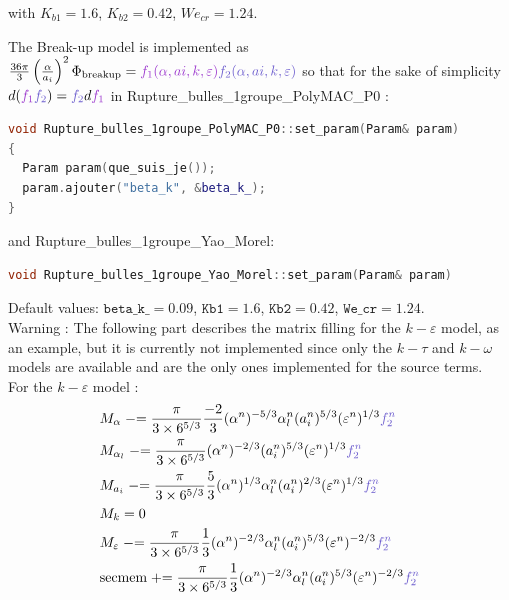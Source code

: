 with $K_{b1} = 1.6$, $K_{b2} = 0.42$, $We_{cr} = 1.24$.

The {\colorbox{codebackground}{\color{codekeyword3}  Break-up}} model is implemented as $\frac{36\pi}{3}\parent{\frac{\alpha}{a_i}}^2\Phi_{\text{breakup}}={\color{mydarkorchid}f_1(\alpha,ai,k,\varepsilon)}{\color{myslateblue} f_2(\alpha,ai,k,\varepsilon)}$ so that for the sake of simplicity $d({\color{mydarkorchid}f_1}{\color{myslateblue} f_2})={\color{myslateblue} f_2}d{\color{mydarkorchid} f_1}$  in {\color{mydarkorchid} Rupture_bulles_1groupe_PolyMAC_P0} : 
\begin{lstlisting}[language=c++]
void Rupture_bulles_1groupe_PolyMAC_P0::set_param(Param& param)
{
  Param param(que_suis_je());
  param.ajouter("beta_k", &beta_k_);
}
\end{lstlisting}
and {\color{myslateblue} Rupture_bulles_1groupe_Yao_Morel}:
\begin{lstlisting}[language=c++]
void Rupture_bulles_1groupe_Yao_Morel::set_param(Param& param)
\end{lstlisting}
Default values: $\texttt{beta\_k\_} = 0.09$, $\texttt{Kb1} = 1.6$, $\texttt{Kb2} = 0.42$, $\texttt{We\_cr} = 1.24$.\\
{\color{red} Warning} : The following part describes the matrix filling for the $k-\varepsilon$ model, as an example, but it is currently not implemented since only the $k-\tau$ and $k-\omega$ models are available and are the only ones implemented for the source terms.\\
For the $k-\varepsilon$ model : 
\begin{align}
    &M_{\alpha} \minuseq \frac{\pi}{3\times 6^{5/3}}\frac{-2}{3}(\alpha^n)^{-5/3}\alpha_l^n(a_i^n)^{5/3}(\varepsilon^n)^{1/3} {\color{myslateblue} f_2^n}\\
    &M_{\alpha_l} \minuseq \frac{\pi}{3\times 6^{5/3}}(\alpha^n)^{-2/3}(a_i^n)^{5/3}(\varepsilon^n)^{1/3} {\color{myslateblue} f_2^n}\\
    &M_{a_i} \minuseq \frac{\pi}{3\times 6^{5/3}}\frac{5}{3}(\alpha^n)^{1/3}\alpha_l^n(a_i^n)^{2/3}(\varepsilon^n)^{1/3} {\color{myslateblue} f_2^n}\\
    &M_{k}=0\\
    &M_{\varepsilon} \minuseq \frac{\pi}{3\times 6^{5/3}}\frac{1}{3}(\alpha^n)^{-2/3}\alpha_l^n(a_i^n)^{5/3}(\varepsilon^n)^{-2/3} {\color{myslateblue} f_2^n}\\
    &\text{secmem}  \pluseq  \frac{\pi}{3\times 6^{5/3}}\frac{1}{3}(\alpha^n)^{-2/3}\alpha_l^n(a_i^n)^{5/3}(\varepsilon^n)^{-2/3} {\color{myslateblue} f_2^n}\\
\end{align}

